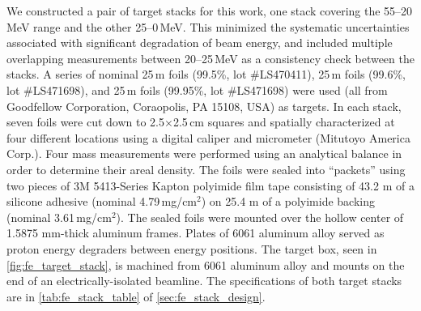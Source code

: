 We constructed a pair of target stacks 
for this work,
one stack covering the 55--20\,MeV range and the other  25--0\,MeV.
This minimized the systematic uncertainties associated with significant degradation of beam energy, and
included multiple overlapping measurements between 20--25\,MeV as a consistency check between the stacks.
A series of nominal 25\,\mmicro m  foils (99.5\%, lot \#LS470411), 25\,\mmicro m  foils (99.6\%, lot \#LS471698), and 25\,\mmicro m  foils (99.95\%, lot \#LS471698) were used (all from Goodfellow Corporation, Coraopolis, PA 15108, USA) as targets.
In each stack, seven foils 
were cut down to 2.5$\times$2.5\,cm squares and spatially characterized 
at four different locations using a digital caliper and micrometer (Mitutoyo America Corp.).
Four mass measurements were performed using an analytical balance 
in order to determine their areal density. 
The foils were  sealed into \enquote{packets} using two pieces of  3M 5413-Series Kapton polyimide film tape 
consisting of 43.2 \mmicro m of a silicone adhesive (nominal 4.79\,mg/cm$^2$) on 25.4 \mmicro m of a polyimide backing (nominal 3.61\,mg/cm$^2$).
The sealed foils were mounted over the hollow center of  1.5875 mm-thick aluminum frames.
Plates of 6061 aluminum alloy  served as proton energy degraders  between energy positions.
The target box, seen in \autoref{fig:fe_target_stack}, is machined from 6061 aluminum alloy and mounts on the end of an electrically-isolated beamline.
The specifications of both target stacks 
are in \autoref{tab:fe_stack_table} of 
\ref{sec:fe_stack_design}.



